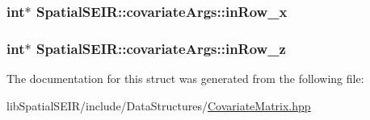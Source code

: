 \hypertarget{structSpatialSEIR_1_1covariateArgs_af1c371b03a94d277a43d9f5aecc117aa}{
\subsubsection[{in\-Row\-\_\-x}]{\setlength{\rightskip}{0pt plus 5cm}int$\ast$ Spatial\-S\-E\-I\-R\-::covariate\-Args\-::in\-Row\-\_\-x}}\label{structSpatialSEIR_1_1covariateArgs_af1c371b03a94d277a43d9f5aecc117aa}
\hypertarget{structSpatialSEIR_1_1covariateArgs_a669bcd8ad82576664761bb25bfaba53e}{
\subsubsection[{in\-Row\-\_\-z}]{\setlength{\rightskip}{0pt plus 5cm}int$\ast$ Spatial\-S\-E\-I\-R\-::covariate\-Args\-::in\-Row\-\_\-z}}\label{structSpatialSEIR_1_1covariateArgs_a669bcd8ad82576664761bb25bfaba53e}


The documentation for this struct was generated from the following file\-:\begin{DoxyCompactItemize}
\item 
lib\-Spatial\-S\-E\-I\-R/include/\-Data\-Structures/\hyperlink{CovariateMatrix_8hpp}{Covariate\-Matrix.\-hpp}\end{DoxyCompactItemize}
